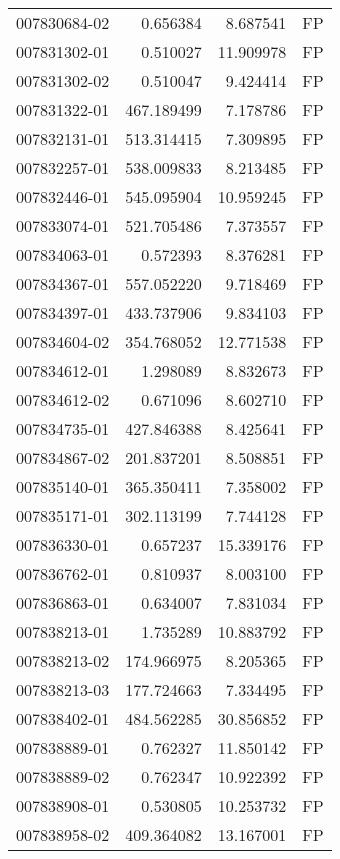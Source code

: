 \begin{tabular}{lrrl}
007830684-02 &    0.656384 &     8.687541 &   FP \\
007831302-01 &    0.510027 &    11.909978 &   FP \\
007831302-02 &    0.510047 &     9.424414 &   FP \\
007831322-01 &  467.189499 &     7.178786 &   FP \\
007832131-01 &  513.314415 &     7.309895 &   FP \\
007832257-01 &  538.009833 &     8.213485 &   FP \\
007832446-01 &  545.095904 &    10.959245 &   FP \\
007833074-01 &  521.705486 &     7.373557 &   FP \\
007834063-01 &    0.572393 &     8.376281 &   FP \\
007834367-01 &  557.052220 &     9.718469 &   FP \\
007834397-01 &  433.737906 &     9.834103 &   FP \\
007834604-02 &  354.768052 &    12.771538 &   FP \\
007834612-01 &    1.298089 &     8.832673 &   FP \\
007834612-02 &    0.671096 &     8.602710 &   FP \\
007834735-01 &  427.846388 &     8.425641 &   FP \\
007834867-02 &  201.837201 &     8.508851 &   FP \\
007835140-01 &  365.350411 &     7.358002 &   FP \\
007835171-01 &  302.113199 &     7.744128 &   FP \\
007836330-01 &    0.657237 &    15.339176 &   FP \\
007836762-01 &    0.810937 &     8.003100 &   FP \\
007836863-01 &    0.634007 &     7.831034 &   FP \\
007838213-01 &    1.735289 &    10.883792 &   FP \\
007838213-02 &  174.966975 &     8.205365 &   FP \\
007838213-03 &  177.724663 &     7.334495 &   FP \\
007838402-01 &  484.562285 &    30.856852 &   FP \\
007838889-01 &    0.762327 &    11.850142 &   FP \\
007838889-02 &    0.762347 &    10.922392 &   FP \\
007838908-01 &    0.530805 &    10.253732 &   FP \\
007838958-02 &  409.364082 &    13.167001 &   FP \\

\end{tabular}
